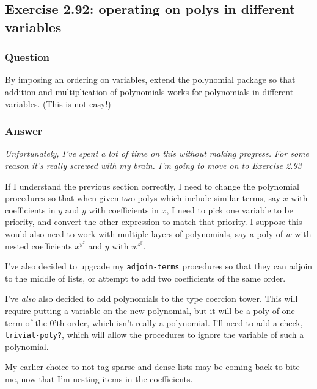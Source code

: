 \documentclass[final,fleqn,titlepage,twoside]{article}
\begin{document}
\subsection{Exercise 2.92: operating on polys in different variables}
\label{sec:orgaed8b73}
\subsubsection{Question}
\label{sec:org5b002b1}
By imposing an ordering on variables, extend the polynomial package so that
addition and multiplication of polynomials works for polynomials in different
variables. (This is not easy!)

\subsubsection{Answer}
\label{sec:orgb51ac70}
\begin{center}
\emph{\emph{Unfortunately, I've spent a lot of time on this without making progress. For
some reason it's really screwed with my brain. I'm going to move on to
\hyperref[sec:org08d2326]{Exercise 2.93}}}
\end{center}

If I understand the previous section correctly, I need to change the polynomial
procedures so that when given two polys which include similar terms, say \(x\)
with coefficients in \(y\) and \(y\) with coefficients in \(x\), I need to pick
one variable to be priority, and convert the other expression to match that
priority. I suppose this would also need to work with multiple layers of
polynomials, say a poly of \(w\) with nested coefficients \(x^y^z\) and \(y\)
with \(w^z^y\).

I've also decided to upgrade my \texttt{adjoin-terms} procedures so that they
can adjoin to the middle of lists, or attempt to add two coefficients of the
same order.

I've \emph{also} also decided to add polynomials to the type coercion tower. This
will require putting a variable on the new polynomial, but it will be a poly of
one term of the 0'th order, which isn't really a polynomial. I'll need to add a
check, \texttt{trivial-poly?}, which will allow the procedures to ignore the
variable of such a polynomial.

My earlier choice to not tag sparse and dense lists may be coming back to bite
me, now that I'm nesting items in the coefficients.
\end{document}
